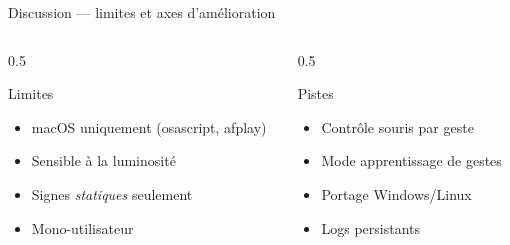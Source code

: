 \documentclass[aspectratio=169,12pt]{beamer}
\begin{document}
\begin{frame}{Discussion --- limites et axes d'am\'elioration}
  \begin{columns}
    \begin{column}{0.5\textwidth}
      \begin{block}{Limites}
        \begin{itemize}
          \item macOS uniquement (osascript, afplay)
          \item Sensible \`a la luminosit\'e
          \item Signes \emph{statiques} seulement
          \item Mono-utilisateur
        \end{itemize}
      \end{block}
    \end{column}
    \begin{column}{0.5\textwidth}
      \begin{block}{Pistes}
        \begin{itemize}
          \item Contr\^ole souris par geste
          \item Mode apprentissage de gestes
          \item Portage Windows/Linux
          \item Logs persistants
        \end{itemize}
      \end{block}
    \end{column}
  \end{columns}
\end{frame}
\end{document}
